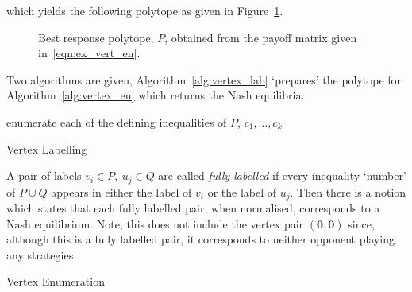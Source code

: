 which yields the following polytope as given in Figure~\ref{fig:best_resp_polytope}.

\begin{figure}
    \centering
    
    \caption{Best response polytope, \(P\), obtained from the payoff matrix given in~\eqref{eqn:ex_vert_en}.}\label{fig:best_resp_polytope}
\end{figure}

Two algorithms are given, Algorithm~\ref{alg:vertex_lab} `prepares' the polytope
for Algorithm~\ref{alg:vertex_en} which returns the Nash equilibria.

\IncMargin{2em}
\begin{algorithm}
    \footnotesize
    \DontPrintSemicolon

    enumerate each of the defining inequalities of \(P\), \(c_{1}, \ldots,
    c_{k}\) \\
    \caption{Vertex Labelling}\label{alg:vertex_lab}
\end{algorithm}
\DecMargin{2em}

A pair of labels \(v_{i} \in P, ~ u_{j} \in Q\) are called \emph{fully labelled}
if every inequality `number' of \(P \cup Q\) appears in either the label of
\(v_{i}\) or the label of \(u_{j}\). Then there is a notion which states that
each fully labelled pair, when normalised, corresponds to a Nash equilibrium.
Note, this does not include the vertex pair \((\textbf{0}, \textbf{0})\) since,
although this is a fully labelled pair, it corresponds to neither opponent playing any strategies. 

\IncMargin{2em}
\begin{algorithm}
    \footnotesize
    \DontPrintSemicolon

    \caption{Vertex Enumeration}\label{alg:vertex_en}
\end{algorithm}
\DecMargin{2em}

